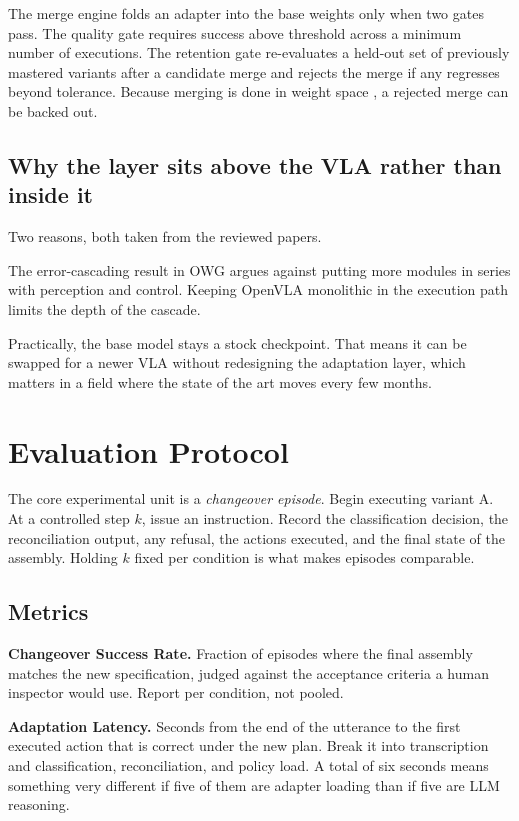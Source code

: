 \documentclass[conference]{IEEEtran}
\begin{document}
The merge engine folds an adapter into the base weights only when two
gates pass. The quality gate requires success above threshold across a
minimum number of executions. The retention gate re-evaluates a held-out
set of previously mastered variants after a candidate merge and rejects
the merge if any regresses beyond tolerance. Because merging is done in
weight space \cite{soups,taskarith}, a rejected merge can be backed out.

\subsection{Why the layer sits above the VLA rather than inside it}

Two reasons, both taken from the reviewed papers.

The error-cascading result in OWG \cite{owg} argues against putting more
modules in series with perception and control. Keeping OpenVLA monolithic
in the execution path limits the depth of the cascade.

Practically, the base model stays a stock checkpoint. That means it can
be swapped for a newer VLA without redesigning the adaptation layer,
which matters in a field where the state of the art moves every few
months.

\section{Evaluation Protocol}
\label{sec:eval}

The core experimental unit is a \emph{changeover episode}. Begin
executing variant A. At a controlled step $k$, issue an instruction.
Record the classification decision, the reconciliation output, any
refusal, the actions executed, and the final state of the assembly.
Holding $k$ fixed per condition is what makes episodes comparable.

\subsection{Metrics}

\textbf{Changeover Success Rate.} Fraction of episodes where the final
assembly matches the new specification, judged against the acceptance
criteria a human inspector would use. Report per condition, not pooled.

\textbf{Adaptation Latency.} Seconds from the end of the utterance to the
first executed action that is correct under the new plan. Break it into
transcription and classification, reconciliation, and policy load. A
total of six seconds means something very different if five of them are
adapter loading than if five are LLM reasoning.
\end{document}
